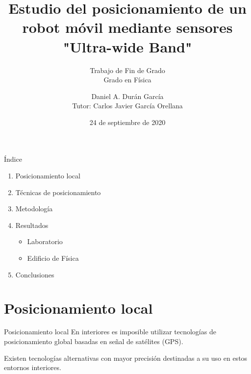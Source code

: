 \documentclass[xcolor=table]{beamer}
\title{Estudio del posicionamiento de un robot móvil mediante sensores "Ultra-wide Band"}
\subtitle{Trabajo de Fin de Grado \\ Grado en Física}
\date{24 de septiembre de 2020}
\author{Daniel A. Durán García \\ Tutor: Carlos Javier García Orellana}
\institute{Universidad de Extremadura}
\begin{document}



  \frame{\titlepage}
  \logo{}
  
  \begin{frame}{Índice}
    \begin{enumerate}
      \item Posicionamiento local
      \item Técnicas de posicionamiento
      \item Metodología
      \item Resultados
      \begin{itemize}
        \item Laboratorio
        \item Edificio de Física
      \end{itemize}
      \item Conclusiones
    \end{enumerate}
    \end{frame}


  \section{Posicionamiento local}
    \begin{frame}{Posicionamiento local}
      En interiores es imposible utilizar tecnologías de posicionamiento global basadas en señal de satélites (GPS).

      Existen tecnologías alternativas con mayor precisión destinadas a su uso en estos entornos interiores.
      
      \vspace*{-0.4cm}
      \begin{figure}[H]
        \centering
        \def\svgwidth{1.25\linewidth}
        \hspace*{-0.2cm}
        
        \label{fig:general}
      \end{figure}
    \end{frame}
\end{document}
